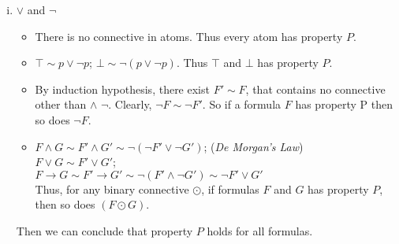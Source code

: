 \documentclass[12pt]{article}
\begin{document}
\begin{enumerate}
\begin{enumerate} [(i)]
          \item $\vee$ and $\neg$ 
            \begin{itemize}
                \item There is no connective in atoms. Thus every atom has property $P$. 
                \item $\top \sim p \vee \neg p$; $\bot \sim \neg (p \vee \neg p) $. Thus $\top$ and $\bot$ has property $P$. 
                \item By induction hypothesis, there exist $F' \sim F$, that contains no connective other than $\wedge$  $\neg$.  Clearly, $\neg F \sim \neg F'$.  So if a formula $F$ has property P then so does $\neg F$.
                \item $F \wedge G \sim F' \wedge G' \sim \neg (\neg F' \vee \neg G') $; (\textit{De Morgan's Law}) \\
                 $F \vee G \sim F' \vee G'$;  \\
                 $ F \rightarrow G \sim F' \rightarrow G' \sim \neg (F' \wedge \neg G') \sim \neg F' \vee G'$ \\
                 Thus, for any binary connective $\odot$, if formulas $F$ and $G$ has property $P$, then so does $(F \odot G)$. 
            \end{itemize}
       Then we can conclude that property $P$ holds for all formulas.    
    \end{enumerate}
    

\end{enumerate}
\end{document}
